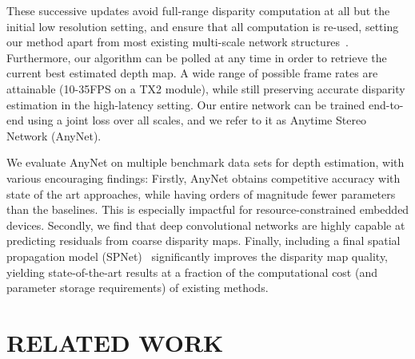 \documentclass[letterpaper, 10 pt, conference]{ieeeconf}
\newcommand{\namelong}[1]{Anytime Stereo Network}
\newcommand{\nameshort}[1]{AnyNet}
\begin{document}
These successive updates avoid full-range disparity computation at all but the initial low resolution setting, and ensure that all computation is re-used, setting our method apart from most existing multi-scale network structures~\cite{saxena2016convolutional,huang2017multi,ke2016neural}. Furthermore, our algorithm can be polled at any time in order to retrieve the current best estimated depth map. A wide range of possible frame rates are attainable (10-35FPS on a TX2 module), while still preserving accurate disparity estimation in the high-latency setting. Our entire network can be trained end-to-end using a joint loss over all scales, and we  refer to it as \namelong{} (\nameshort{}). 


















We evaluate \nameshort{} on multiple benchmark data sets for depth estimation, with various encouraging findings: Firstly, \nameshort{} obtains competitive accuracy with state of the art approaches, while having orders of magnitude fewer parameters than the baselines. This is especially impactful for resource-constrained embedded devices. Secondly, we find that deep convolutional networks are highly capable at predicting residuals from coarse disparity maps. Finally, including a final spatial propagation model (SPNet)~\cite{liu2017learning} significantly improves the disparity map quality, yielding state-of-the-art results at a fraction of the computational cost (and parameter storage requirements) of existing methods.



%
 	
	
	

\section{RELATED WORK}
\end{document}
